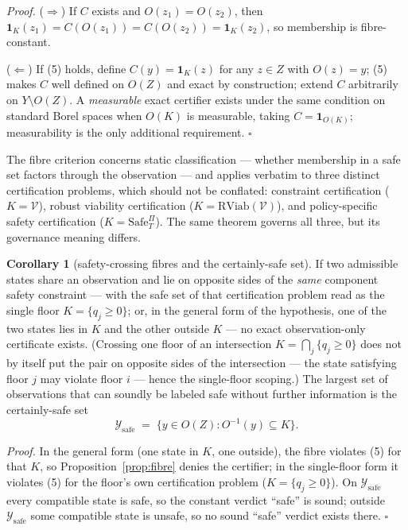 \documentclass[11pt]{article}
\theoremstyle{definition}
\newtheorem{corollary}{Corollary}
\begin{document}
\emph{Proof.} (\(\Rightarrow\)) If \(C\) exists and \(O(z_1) = O(z_2)\),
then \(\mathbf{1}_K(z_1) = C(O(z_1)) = C(O(z_2)) = \mathbf{1}_K(z_2)\),
so membership is fibre-constant.

(\(\Leftarrow\)) If (5) holds, define \(C(y) = \mathbf{1}_K(z)\) for any
\(z \in Z\) with \(O(z) = y\); (5) makes \(C\) well defined on \(O(Z)\)
and exact by construction; extend \(C\) arbitrarily on
\(Y \setminus O(Z)\). A \emph{measurable} exact certifier exists under
the same condition on standard Borel spaces when \(O(K)\) is measurable,
taking \(C = \mathbf{1}_{O(K)}\); measurability is the only additional requirement. \ensuremath{\square}

The fibre criterion concerns static classification --- whether
membership in a safe set factors through the observation --- and applies
verbatim to three distinct certification problems, which should not be
conflated: constraint certification (\(K = \mathcal{V}\)), robust
viability certification (\(K = \mathrm{RViab}(\mathcal{V})\)), and
policy-specific safety certification (\(K = \mathrm{Safe}^{\Pi}_T\)).
The same theorem governs all three, but its governance meaning differs.

\begin{corollary}[safety-crossing fibres and the certainly-safe set]\label{cor:certainly-safe} If two admissible states share an observation and lie on opposite
sides of the \emph{same} component safety constraint --- with the safe
set of that certification problem read as the single floor
\(K = \{ q_j \ge 0 \}\); or, in the general form of the hypothesis, one
of the two states lies in \(K\) and the other outside \(K\) --- no exact
observation-only certificate exists. (Crossing one floor of an
intersection \(K = \bigcap_j \{ q_j \ge 0 \}\) does not by itself put
the pair on opposite sides of the intersection --- the state satisfying
floor \(j\) may violate floor \(i\) --- hence the single-floor scoping.)
The largest set of observations that can soundly be labeled safe without
further information is the certainly-safe set
\[\mathcal{Y}_{\mathrm{safe}} \;=\; \big\{ y \in O(Z) : O^{-1}(y) \subseteq K \big\}.\]

\end{corollary}

\emph{Proof.} In the general form (one state in \(K\), one outside), the
fibre violates (5) for that \(K\), so Proposition~\ref{prop:fibre} denies the certifier; in
the single-floor form it violates (5) for the floor's own certification
problem (\(K = \{q_j \ge 0\}\)). On \(\mathcal{Y}_{\mathrm{safe}}\)
every compatible state is safe, so the constant verdict ``safe'' is
sound; outside \(\mathcal{Y}_{\mathrm{safe}}\) some compatible state is
unsafe, so no sound ``safe'' verdict exists there. \ensuremath{\square}
\end{document}
